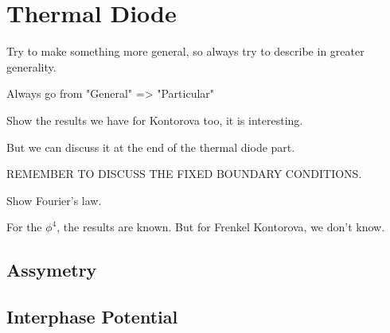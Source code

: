 \section{Thermal Diode}

Try to make something more general, so always try to describe in greater generality.

Always go from "General" => "Particular"

Show the results we have for Kontorova too, it is interesting.

But we can discuss it at the end of the thermal diode part.

REMEMBER TO DISCUSS THE FIXED BOUNDARY CONDITIONS.

Show Fourier's law.

For the $ \phi^{4} $, the results are known. But for Frenkel Kontorova, we don't know.


\subsection{Assymetry}

\subsection{Interphase Potential}